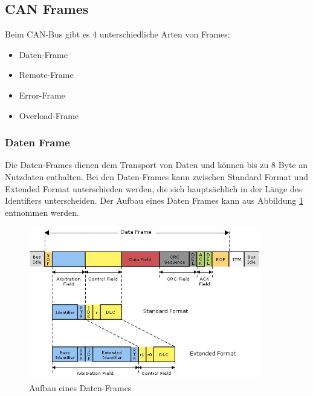 \subsection{CAN Frames} Beim CAN-Bus gibt es 4 unterschiedliche Arten
von Frames: 
\begin{itemize} 
\item Daten-Frame 
\item Remote-Frame 
\item Error-Frame 
\item Overload-Frame 
\end{itemize} 

\subsubsection{Daten Frame} 
Die Daten-Frames dienen dem Transport von Daten und können bis
zu 8 Byte an Nutzdaten enthalten. Bei den Daten-Frames kann zwischen
Standard Format und Extended Format unterschieden werden, die sich
hauptsächlich in der Länge des Identifiers unterscheiden. Der Aufbau
eines Daten Frames kann aus Abbildung \ref{data} entnommen werden.
	
\begin{figure}[h] 
\centering
\includegraphics[width=0.9\textwidth]{figures/data-frame}
\caption{Aufbau eines Daten-Frames \citep{HYC}} 
\label{data}
\end{figure} 
		
